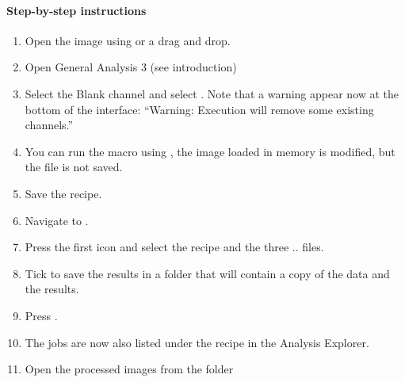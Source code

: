 \paragraph{Step-by-step instructions}
\begin{enumerate} 
    \item Open the image  using  or a drag and drop.
    \item Open General Analysis 3 (see introduction)
    \item Select the Blank channel and select . Note that a warning appear now at the bottom of the interface: ``Warning: Execution will remove some existing channels.''
    \item You can run the macro using , the image loaded in memory is modified, but the file is not saved.
    \item Save the recipe.
    \item Navigate to .
    \item Press the first icon  and select the recipe and the three  ..   files.
    \item Tick  to save the results in a folder 
     that will contain a copy of the data and the results.
    \item Press .
    \item The jobs are now also listed under the recipe in the Analysis Explorer.
    \item Open the processed images from the folder 
\end{enumerate}